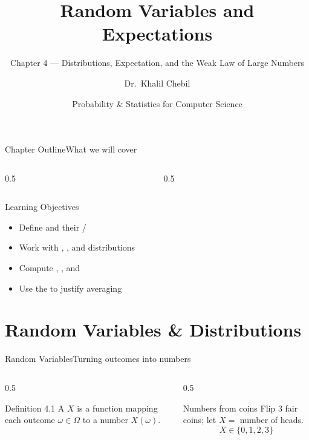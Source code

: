 \documentclass[aspectratio=169,11pt]{beamer}
\title[Ch.\,4 — Random Variables]{Random Variables and Expectations}
\subtitle{Chapter 4 — Distributions, Expectation, and the Weak Law of Large Numbers}
\author{Dr.\ Khalil Chebil}
\date{Probability \& Statistics for Computer Science}
\begin{document}
{
\begin{frame}
  \titlepage
\end{frame}}

\begin{frame}{Chapter Outline}{What we will cover}
  \begin{columns}[T]
    \begin{column}{0.5\textwidth}
      \tableofcontents[sections={1-4}]
    \end{column}
    \begin{column}{0.5\textwidth}
      \tableofcontents[sections={5-8}]
    \end{column}
  \end{columns}
  \vfill
  \begin{block}{Learning Objectives}
    \begin{itemize}
      \item Define  and their /
      \item Work with , , and  distributions
      \item Compute , , and 
      \item Use the  to justify averaging
    \end{itemize}
  \end{block}
\end{frame}

\section{Random Variables \& Distributions}

\begin{frame}{Random Variables}{Turning outcomes into numbers}
  \begin{columns}[T]
    \begin{column}{0.5\textwidth}
      \begin{block}{Definition 4.1}
        \small A  $X$ is a function
        mapping each outcome $\omega\in\Omega$ to a number $X(\omega)$.
      \end{block}
    \end{column}
    \begin{column}{0.5\textwidth}
      \begin{exampleblock}{Numbers from coins}
        \small Flip 3 fair coins; let $X = $ number of heads.
        \[ X \in \{0,1,2,3\} \]
      \end{exampleblock}
    \end{column}
  \end{columns}
\end{frame}
\end{document}
